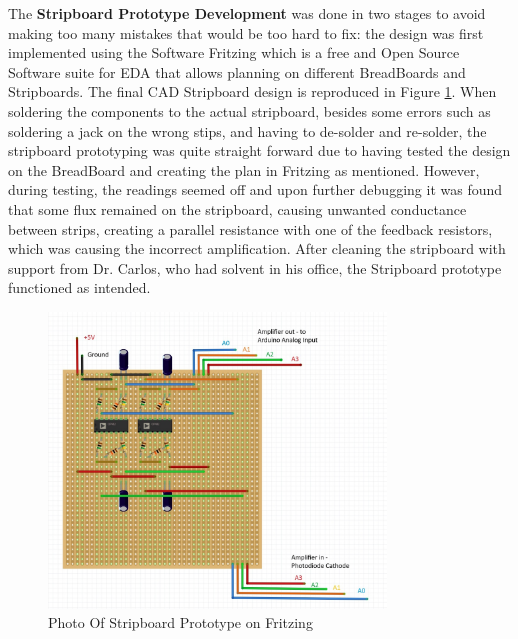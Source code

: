 \noindent The {\bfseries Stripboard Prototype Development} was done in two stages to avoid making too many mistakes that would be too hard to fix: the design was first implemented using the Software Fritzing which is a free and Open Source Software suite for \ac{EDA} that allows planning on different BreadBoards and Stripboards. The final CAD Stripboard design is reproduced in Figure \ref{fig:StripboardFritzing}.
When soldering the components to the actual stripboard, besides some errors such as soldering a jack on the wrong stips, and having to de-solder and re-solder, the stripboard prototyping was quite straight forward due to having tested the design on the BreadBoard and creating the plan in Fritzing as mentioned. However, during testing, the readings seemed off and upon further debugging it was found that some flux remained on the stripboard, causing unwanted conductance between strips, creating a parallel resistance with one of the feedback resistors, which was causing the incorrect amplification. After cleaning the stripboard with support from Dr. Carlos, who had solvent in his office, the Stripboard prototype functioned as intended. 
%
\begin{figure}[htbp] %
  \centering
  \includegraphics[width=0.8\textwidth]{chapters/methodology/prototype/StripboardPhotoFritzing.jpg}
  \caption{Photo Of Stripboard Prototype on Fritzing}
  \label{fig:StripboardFritzing}
\end{figure}
%
